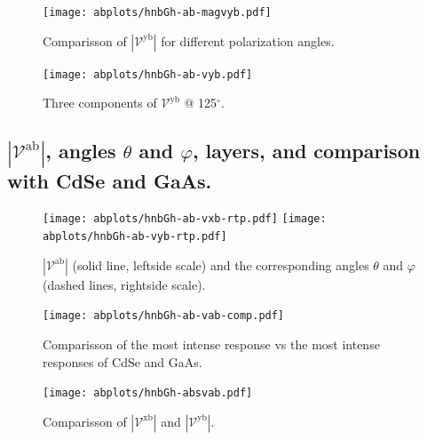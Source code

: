 \documentclass{article}
\let\Oldsubsection\subsection
\renewcommand{\subsection}{\FloatBarrier\Oldsubsection}
\begin{document}
\begin{figure}[ht!]
    \centering
    \texttt{[image: abplots/hnbGh-ab-magvyb.pdf]}
    \caption{Comparisson of $|\mathcal{V}^{\mathrm{yb}}|$ for different
    polarization angles.}
    \label{fig:ab-magvyb}
\end{figure}
\begin{figure}[ht!]
    \centering
    \texttt{[image: abplots/hnbGh-ab-vyb.pdf]}
    \caption{Three components of $\mathcal{V}^{\mathrm{yb}} $ @ 125$^{\circ}$.}
    \label{fig:ab-vyb}
\end{figure}

\clearpage

\subsection{$|\mathcal{V}^{\mathrm{ab}}|$, angles
$\theta$ and $\varphi$, layers, and comparison with CdSe and GaAs.}
\begin{figure}[ht]
    \centering
    \texttt{[image: abplots/hnbGh-ab-vxb-rtp.pdf]}
    \texttt{[image: abplots/hnbGh-ab-vyb-rtp.pdf]}
    \caption{$|\mathcal{V}^{\mathrm{ab}}|$ (solid line, leftside scale) and the
    corresponding angles $\theta$ and $\varphi$ (dashed lines, rightside scale).}
    \label{fig:ab-rtp}
\end{figure}
 

\begin{figure}[ht]
    \centering
    \texttt{[image: abplots/hnbGh-ab-vab-comp.pdf]}
    \caption{Comparisson of the most intense response vs the most intense
    responses of CdSe and GaAs.}
    \label{fig:ab-comp}
\end{figure}


\begin{figure}[ht]
    \centering
    \texttt{[image: abplots/hnbGh-absvab.pdf]}
    \caption{Comparisson of $|\mathcal{V}^{\mathrm{xb}}|$ and $|\mathcal{V}^{\mathrm{yb}}|$.}    
    \label{fig:ab-xbybcomp}
\end{figure}


\end{document}

